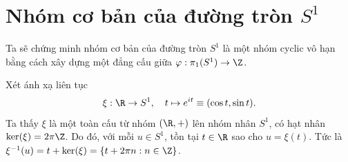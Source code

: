 \section{Nhóm cơ bản của đường tròn $S^1$}
	
	Ta sẽ chứng minh nhóm cơ bản của đường tròn $S^1$ là một nhóm cyclic vô hạn bằng cách xây dựng một đẳng cấu giữa $\varphi: \pi_1(S^1)\to \Z$.
		
		
		
	
	
Xét ánh xạ liên tục \[\xi: \R \to S^1, \quad t\mapsto e^{it} \equiv (\cos t, \sin t).\] 
	Ta thấy $\xi$ là một toàn cấu từ nhóm $(\R,+)$ lên nhóm nhân $S^1$, có hạt nhân $\ker(\xi)=2\pi\Z$. Do đó, với mỗi $u \in S^1$, tồn tại $t\in \R$ sao cho $u=\xi(t)$. Tức là $\xi^{-1}(u) = t + \ker(\xi) =  \{t + 2\pi n:  n \in \Z\}$.
	
